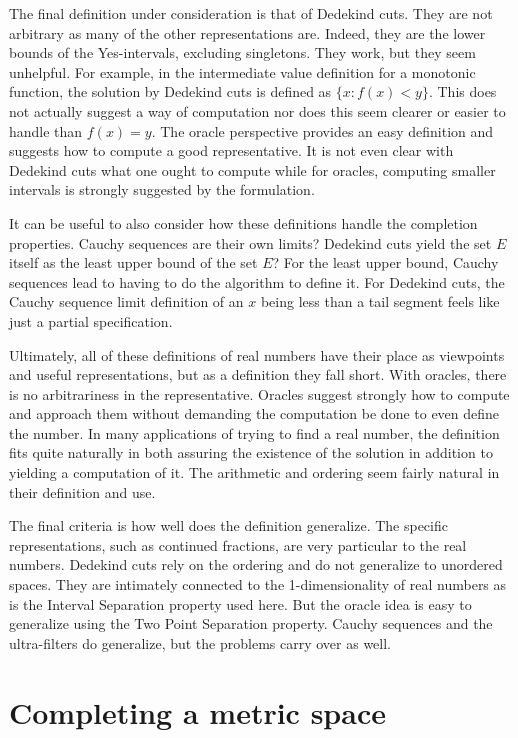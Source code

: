 \documentclass[12pt]{article}
\theoremstyle{remark}
\begin{document}
The final definition under consideration is that of Dedekind cuts. They are not arbitrary as many of the other representations are. Indeed, they are the lower bounds of the Yes-intervals, excluding singletons. They work, but they seem unhelpful. For example, in the intermediate value definition for a monotonic function, the solution by Dedekind cuts is defined as $\{x: f(x) < y\}$. This does not actually suggest a way of computation nor does this seem clearer or easier to handle than $f(x) = y$. The oracle perspective provides an easy definition and suggests how to compute a good representative. It is not even clear with Dedekind cuts what one ought to compute while for oracles, computing smaller intervals is strongly suggested by the formulation. 

It can be useful to also consider how these definitions handle the completion properties. Cauchy sequences are their own limits? Dedekind cuts yield the set $E$ itself as the least upper bound of the set $E$? For the least upper bound, Cauchy sequences lead to having to do the algorithm to define it. For Dedekind cuts, the Cauchy sequence limit definition of an $x$ being less than a tail segment feels like just a partial specification. 

Ultimately, all of these definitions of real numbers have their place as viewpoints and useful representations, but as a definition they fall short. With oracles, there is no arbitrariness in the representative. Oracles suggest strongly how to compute and approach them without demanding the computation be done to even define the number. In many applications of trying to find a real number, the definition fits quite naturally in both assuring the existence of the solution in addition to yielding a computation of it. The arithmetic and ordering seem fairly natural in their definition and use. 

The final criteria is how well does the definition generalize. The specific representations, such as continued fractions, are very particular to the real numbers. Dedekind cuts rely on the ordering and do not generalize to unordered spaces. They are intimately connected to the 1-dimensionality of real numbers as is the Interval Separation property used here. But the oracle idea is easy to generalize using the Two Point Separation property. Cauchy sequences and the ultra-filters do generalize, but the problems carry over as well. 

\section{Completing a metric space}
\end{document}
